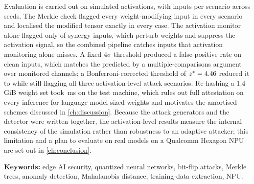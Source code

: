 Evaluation is carried out on simulated activations, with \NPerScenario{} inputs per scenario
across \NSeeds{} seeds. The Merkle check flagged every weight-modifying input in every scenario
and localised the modified tensor exactly in every case. The activation monitor alone flagged
only \MonSynergy{} of synergy inputs, which perturb weights and suppress the activation signal,
so the combined pipeline catches inputs that activation monitoring alone misses. A fixed
$4\sigma$ threshold produced a \EmpFPRZFour{} false-positive rate on clean inputs, which matches
the \PredFPRZFour{} predicted by a multiple-comparisons argument over \MChannels{} monitored
channels; a Bonferroni-corrected threshold of $z^*=4.46$ reduced it to \EmpFPRBonf{} while
still flagging all three activation-level attack scenarios. Re-hashing a 1.4\,GiB weight set took
\MerkVerLlamaPB{}\,ms on the test machine, which rules out full attestation on every inference
for language-model-sized weights and motivates the amortised schemes discussed in
\cref{ch:discussion}. Because the attack generators and the detector were written together,
the activation-level results measure the internal consistency of the simulation rather than
robustness to an adaptive attacker; this limitation and a plan to evaluate on real models on a
Qualcomm Hexagon NPU are set out in \cref{ch:conclusion}.

\vspace{0.5cm}
\noindent\textbf{Keywords:} edge AI security, quantized neural networks, bit-flip attacks,
Merkle trees, anomaly detection, Mahalanobis distance, training-data extraction, NPU.

\cleardoublepage
\tableofcontents
\cleardoublepage
\listoffigures
{}
\cleardoublepage
\listoftables
{}

